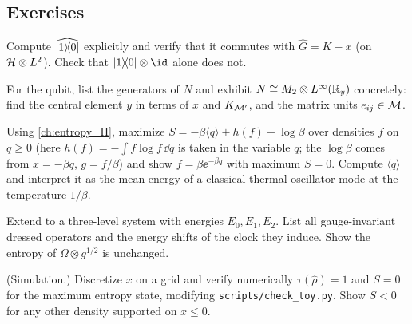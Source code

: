 \subsection*{Exercises}
\begin{exercise}\label{ex:toy_clock:1}
Compute $\widehat{\lvert 1\rangle\!\langle 0\rvert}$ explicitly and verify that it commutes with $\hat G=K-x$ (on $\mathcal{H}\otimes L^2$). Check that $\ket1\!\bra0\otimes\id$ alone does not.
\end{exercise}
\begin{exercise}\label{ex:toy_clock:2}
For the qubit, list the generators of $N$ and exhibit $N\cong M_2\otimes L^\infty(\mathbb{R}_y)$ concretely: find the central element $y$ in terms of $x$ and $K_{\mathcal{M}'}$, and the matrix units $e_{ij}\in\mathcal{M}$.
\end{exercise}
\begin{exercise}\label{ex:toy_clock:3}
Using \cref{ch:entropy_II}, maximize $S=-\beta\langle q\rangle+h(f)+\log\beta$ over densities $f$ on $q\ge0$ (here $h(f)=-\int f\log f\,\dd q$ is taken in the variable $q$; the $\log\beta$ comes from $x=-\beta q$, $g=f/\beta$) and show $f=\beta\ee^{-\beta q}$ with maximum $S=0$. Compute $\langle q\rangle$ and interpret it as the mean energy of a classical thermal oscillator mode at the temperature $1/\beta$.
\end{exercise}
\begin{exercise}\label{ex:toy_clock:4}
Extend to a three-level system with energies $E_0,E_1,E_2$. List all gauge-invariant dressed operators and the energy shifts of the clock they induce. Show the entropy of $\Omega\otimes g^{1/2}$ is unchanged.
\end{exercise}
\begin{exercise}\label{ex:toy_clock:5}
(Simulation.) Discretize $x$ on a grid and verify numerically $\tau(\hat\rho)=1$ and $S=0$ for the maximum entropy state, modifying \texttt{scripts/check\_toy.py}. Show $S<0$ for any other density supported on $x\le0$.
\end{exercise}

